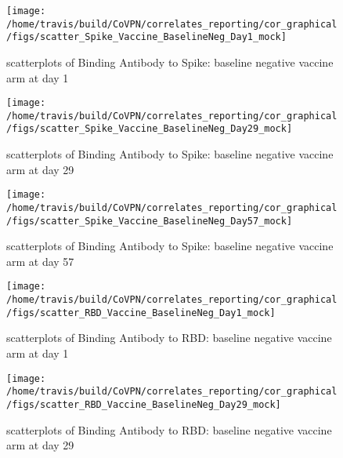 \documentclass[]{book}
\theoremstyle{definition}
\theoremstyle{definition}
\theoremstyle{definition}
\newcommand{\1}{\mathbbm{1}}
\begin{document}
\clearpage
\begin{figure}[H]

{\centering \texttt{[image: /home/travis/build/CoVPN/correlates\_reporting/cor\_graphical/figs/scatter\_Spike\_Vaccine\_BaselineNeg\_Day1\_mock]} 

}

\caption{scatterplots of Binding Antibody to Spike: baseline negative vaccine arm at day 1}\label{fig:unnamed-chunk-251}
\end{figure}

\clearpage
\begin{figure}[H]

{\centering \texttt{[image: /home/travis/build/CoVPN/correlates\_reporting/cor\_graphical/figs/scatter\_Spike\_Vaccine\_BaselineNeg\_Day29\_mock]} 

}

\caption{scatterplots of Binding Antibody to Spike: baseline negative vaccine arm at day 29}\label{fig:unnamed-chunk-252}
\end{figure}

\clearpage
\begin{figure}[H]

{\centering \texttt{[image: /home/travis/build/CoVPN/correlates\_reporting/cor\_graphical/figs/scatter\_Spike\_Vaccine\_BaselineNeg\_Day57\_mock]} 

}

\caption{scatterplots of Binding Antibody to Spike: baseline negative vaccine arm at day 57}\label{fig:unnamed-chunk-253}
\end{figure}

\clearpage
\begin{figure}[H]

{\centering \texttt{[image: /home/travis/build/CoVPN/correlates\_reporting/cor\_graphical/figs/scatter\_RBD\_Vaccine\_BaselineNeg\_Day1\_mock]} 

}

\caption{scatterplots of Binding Antibody to RBD: baseline negative vaccine arm at day 1}\label{fig:unnamed-chunk-254}
\end{figure}

\clearpage
\begin{figure}[H]

{\centering \texttt{[image: /home/travis/build/CoVPN/correlates\_reporting/cor\_graphical/figs/scatter\_RBD\_Vaccine\_BaselineNeg\_Day29\_mock]} 

}

\caption{scatterplots of Binding Antibody to RBD: baseline negative vaccine arm at day 29}\label{fig:unnamed-chunk-255}
\end{figure}
\end{document}
